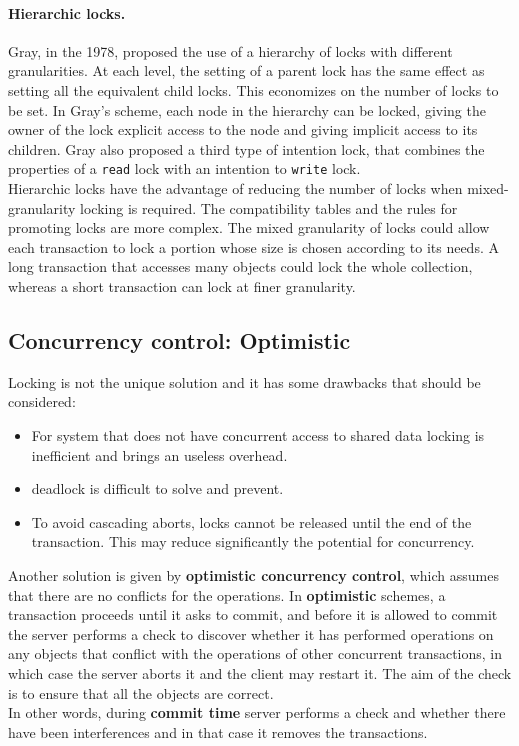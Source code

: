 \paragraph*{Hierarchic locks.} Gray, in the 1978, proposed the use of a hierarchy of locks with different granularities. At each level, the setting of a parent lock has the same effect as setting all the equivalent child locks. This economizes on the number of locks to be set. In Gray’s scheme, each node in the hierarchy can be locked, giving the owner of the lock explicit access to the node and giving implicit access to its children.
Gray also proposed a third type of intention lock, that combines the properties of a \verb|read| lock with an intention to \verb|write| lock.\\
Hierarchic locks have the advantage of reducing the number of locks when mixed-
granularity locking is required. The compatibility tables and the rules for promoting locks are more complex. The mixed granularity of locks could allow each transaction to lock a portion whose size is chosen according to its needs. A long transaction that accesses many objects could lock the whole collection, whereas a short transaction can lock at finer granularity.

\subsection{Concurrency control: Optimistic}
Locking is not the unique solution and it has some drawbacks that should be considered:
\begin{itemize}
	\item For system that does not have concurrent access to shared data locking is inefficient and brings an useless overhead.
	\item deadlock is difficult to solve and prevent.
	\item To avoid cascading aborts, locks cannot be released until the end of the transaction. This may reduce significantly the potential for concurrency.  
\end{itemize}
Another solution is given by \textbf{optimistic concurrency control}, which assumes that there are no conflicts for the operations.
In \textbf{optimistic} schemes, a transaction proceeds until it asks to commit, and before it is allowed to commit the server performs a check to discover whether it has performed operations on any objects that conflict with the operations of other concurrent transactions, in which case the server aborts it and the client may restart it. The aim of the check is to ensure that all the objects are correct. \\
In other words, during \textbf{commit time} server performs a check and whether there have been interferences and in that case it removes the transactions.\\

